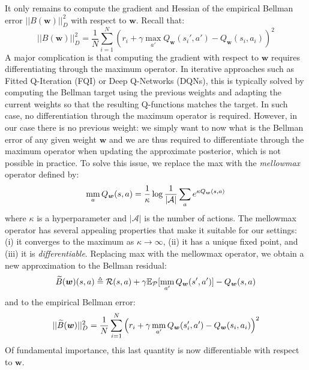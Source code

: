 \documentclass{article}
\newcommand{\mm}{\operatornamewithlimits{mm}}
\begin{document}
It only remains to compute the gradient and Hessian of the empirical Bellman error $||B(\bm{w})||_{D}^2$ with respect to $\bm{w}$. Recall that:
\begin{equation}
||B(\bm{w})||_{D}^2 = \frac{1}{N}\sum_{i=1}^N \left( r_i + \gamma\max_{a'}Q_{\bm{w}}(s_i',a') - Q_{\bm{w}}(s_i,a_i) \right)^2
\end{equation}
A major complication is that computing the gradient with respect to $\bm{w}$ requires differentiating through the maximum operator. In iterative approaches such as Fitted Q-Iteration (FQI) or Deep Q-Networks (DQNs), this is typically solved by computing the Bellman target using the previous weights and adapting the current weights so that the resulting Q-functions matches the target. In such case, no differentiation through the maximum operator is required. However, in our case there is no previous weight: we simply want to now what is the Bellman error of any given weight $\bm{w}$ and we are thus required to differentiate through the maximum operator when updating the approximate posterior, which is not possible in practice. To solve this issue, we replace the max with the \textit{mellowmax} operator defined by:
\begin{equation}
\mm_a Q_{\bm{w}}(s,a) = \frac{1}{\kappa} \log \frac{1}{|\mathcal{A}|}\sum_a e^{\kappa Q_{\bm{w}}(s,a)}
\end{equation}
where $\kappa$ is a hyperparameter and $|\mathcal{A}|$ is the number of actions. The mellowmax operator has several appealing properties that make it suitable for our settings: (i) it converges to the maximum as $\kappa \rightarrow \infty$, (ii) it has a unique fixed point, and (iii) it is \textit{differentiable}. Replacing max with the mellowmax operator, we obtain a new approximation to the Bellman residual:
\begin{equation}
\widetilde{B}(\bm{w})(s,a) \triangleq \mathcal{R}(s,a) + \gamma\mathbb{E}_{\mathcal{P}}[\mm_{a'}Q_{\bm{w}}(s',a')] - Q_{\bm{w}}(s,a)
\end{equation}
and to the empirical Bellman error:
\begin{equation}
||\widetilde{B}(\bm{w})||_{D}^2 = \frac{1}{N}\sum_{i=1}^N \left( r_i + \gamma\mm_{a'}Q_{\bm{w}}(s_i',a') - Q_{\bm{w}}(s_i,a_i) \right)^2
\end{equation}
Of fundamental importance, this last quantity is now differentiable with respect to $\bm{w}$.
\end{document}
